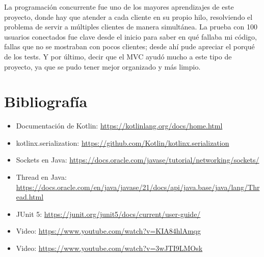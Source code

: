 \documentclass[12pt,letterpaper]{article}
\begin{document}
La programación concurrente fue uno de los mayores aprendizajes de este
proyecto, donde hay que atender a cada cliente en su propio hilo,
resolviendo el problema de servir a múltiples clientes de manera
simultánea. La prueba con 100 usuarios conectados fue clave desde el
inicio para saber en qué fallaba mi código, fallas que no se mostraban
con pocos clientes; desde ahí pude apreciar el porqué de los tests. Y
por último, decir que el MVC ayudó mucho a este tipo de proyecto, ya
que se pudo tener mejor organizado y más limpio.

\section{Bibliografía}

\begin{itemize}
    \item Documentación de Kotlin: \url{https://kotlinlang.org/docs/home.html}
    \item kotlinx.serialization: \url{https://github.com/Kotlin/kotlinx.serialization}
    \item Sockets en Java: \url{https://docs.oracle.com/javase/tutorial/networking/sockets/}
    \item Thread en Java: \url{https://docs.oracle.com/en/java/javase/21/docs/api/java.base/java/lang/Thread.html}
    \item JUnit 5: \url{https://junit.org/junit5/docs/current/user-guide/}
    \item Video: \url{https://www.youtube.com/watch?v=KIA84hlAmqg}
    \item Video: \url{https://www.youtube.com/watch?v=3wJTI9LMOsk}
\end{itemize}
\end{document}
